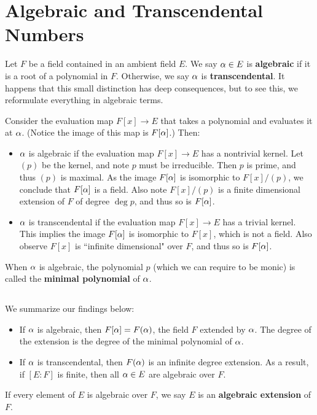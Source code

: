 \section{Algebraic and Transcendental Numbers}
Let $F$ be a field contained in an ambient field $E$. We say $\alpha \in E$ is \textbf{algebraic} if it is a root of a polynomial in $F$. Otherwise, we say $\alpha$ is \textbf{transcendental}. It happens that this small distinction has deep consequences, but to see this, we reformulate everything in algebraic terms.

Consider the evaluation map $F[x] \rightarrow E$ that takes a polynomial and evaluates it at $\alpha$. (Notice the image of this map is $F[\alpha]$.) Then:
\begin{itemize}
    \item $\alpha$ is algebraic if the evaluation map $F[x] \rightarrow E$ has a nontrivial kernel. Let $(p)$ be the kernel, and note $p$ must be irreducible. Then $p$ is prime, and thus $(p)$ is maximal. As the image $F[\alpha]$ is isomorphic to $F[x]/(p)$, we conclude that $F[\alpha]$ is a field. Also note $F[x]/(p)$ is a finite dimensional extension of $F$ of degree $\deg p$, and thus so is $F[\alpha]$.
    \item $\alpha$ is transcendental if the evaluation map $F[x] \rightarrow E$ has a trivial kernel. This implies the image $F[\alpha]$ is isomorphic to $F[x]$, which is not a field. Also observe $F[x]$ is ``infinite dimensional" over $F$, and thus so is $F[\alpha]$.
\end{itemize}
When $\alpha$ is algebraic, the polynomial $p$ (which we can require to be monic) is called the \textbf{minimal polynomial} of $\alpha$.

\subsection{}
We summarize our findings below:
\begin{itemize}
    \item If $\alpha$ is algebraic, then $F[\alpha] = F(\alpha)$, the field $F$ extended by $\alpha$. The degree of the extension is the degree of the minimal polynomial of $\alpha$.
    \item If $\alpha$ is transcendental, then $F(\alpha)$ is an infinite degree extension. As a result, if $[E : F]$ is finite, then all $\alpha \in E$ are algebraic over $F$.
\end{itemize}
If every element of $E$ is algebraic over $F$, we say $E$ is an \textbf{algebraic extension} of $F$.

